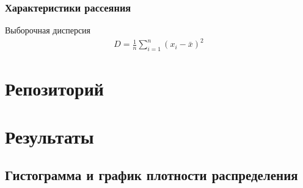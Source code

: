 \subsubsection{Характеристики рассеяния}
Выборочная дисперсия \begin{gather*}
    D = \frac{1}{n}\displaystyle\sum_{i=1}^{n}(x_i - \bar{x})^{2}
\end{gather*}

\section{Репозиторий}

\section{Результаты}
\subsection{Гистограмма и график плотности распределения}
